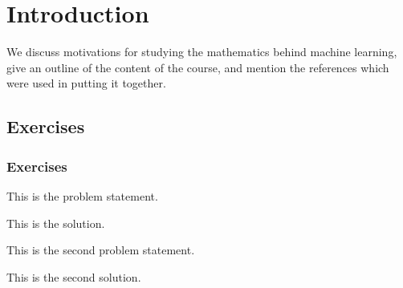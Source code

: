 \chapter{Introduction}

\begin{chout}
	We discuss motivations for studying the mathematics behind machine learning, give an outline of the content of the course, and mention the references which were used in putting it together.
\end{chout}

\section{Exercises}
\subsection{Exercises \basic}
\begin{exercise}
	\begin{problem}
	This is the problem statement.
	\end{problem}
	\begin{solution}
		This is the solution.
	\end{solution}
\end{exercise}

\begin{exercise}
	\begin{problem}
	This is the second problem statement.
	\end{problem}
	\begin{solution}
		This is the second solution.
	\end{solution}
\end{exercise}

